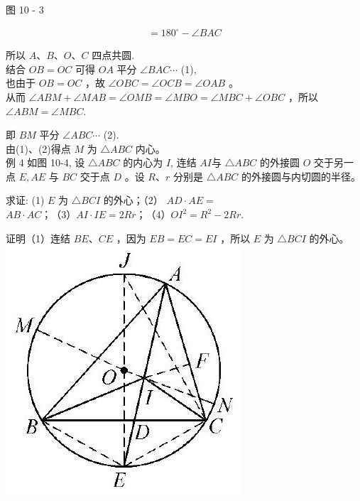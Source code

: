\documentclass[10pt]{article}
\begin{document}
图 10 - 3

\begin{align*}
=180^{\circ}-\angle B A C
\end{align*}

所以 $A 、 B 、 O 、 C$ 四点共圆.\\
结合 $O B=O C$ 可得 $O A$ 平分 $\angle B A C \cdots$ (1),\\
也由于 $O B=O C$ ，故 $\angle O B C=\angle O C B=\angle O A B$ 。\\
从而 $\angle A B M+\angle M A B=\angle O M B=\angle M B O=\angle M B C+\angle O B C$ ，所以 $\angle A B M=\angle M B C$.

即 $B M$ 平分 $\angle A B C \cdots$ (2).\\
由(1)、(2)得点 $M$ 为 $\triangle A B C$ 内心。\\
例 4 如图 10-4, 设 $\triangle A B C$ 的内心为 $I$, 连结 $A I$与 $\triangle A B C$ 的外接圆 $O$ 交于另一点 $E, A E$ 与 $B C$ 交于点 $D$ 。设 $R 、 r$ 分别是 $\triangle A B C$ 的外接圆与内切圆的半径。

求证: (1) $E$ 为 $\triangle B C I$ 的外心；（2） $A D \cdot A E=$ $A B \cdot A C ；（3） A I \cdot I E=2 R r ；（4） O I^{2}=R^{2}-2 R r$.

证明（1）连结 $B E 、 C E$ ，因为 $E B=E C=E I$ ，所以 $E$ 为 $\triangle B C I$ 的外心。\\
\includegraphics[max width=\textwidth, center]{2024_10_30_66b8e5e701da2093c133g-073}
\end{document}
